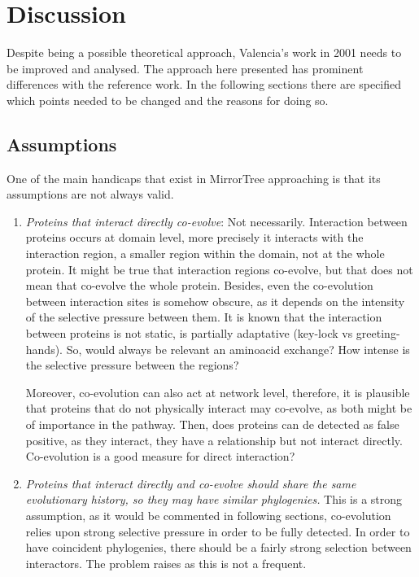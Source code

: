 \documentclass[11pt]{article}
\begin{document}
\section{Discussion}
Despite being a possible theoretical approach, Valencia's work in 2001\cite{Pazos2001} needs to be improved and analysed. The approach here presented has prominent differences with the reference work. In the following sections there are specified which points needed to be changed and the reasons for doing so.

\subsection{Assumptions}
One of the main handicaps that exist in MirrorTree approaching is that its assumptions are not always valid.
\begin{enumerate}
\setlength{\itemsep}{1pt}
	\item \textit{Proteins that interact directly co-evolve}: Not necessarily. Interaction between proteins 		occurs at domain level, more precisely it interacts with the interaction region, a smaller region within 		the domain, not at the whole protein. It might be true that interaction regions co-evolve, but that does 		not mean that co-evolve the whole protein. Besides, even the co-evolution between interaction sites is 		somehow obscure, as it depends on the intensity of the selective pressure between them. It is known that 		the interaction between proteins is not static, is partially adaptative (key-lock vs greeting-hands). So, 	would always be relevant an aminoacid exchange? How intense is the selective pressure between the 			regions?

	Moreover, co-evolution can also act at network level, therefore, it is plausible that proteins that do 		not physically interact may co-evolve, as both might be of importance in the pathway. Then, does proteins 	can de detected as false positive, as they interact, they have a relationship but not interact directly. 		Co-evolution is a good measure for direct interaction?

	\item \textit{Proteins that interact directly and co-evolve should share the same evolutionary history, 		so they may have similar phylogenies.} This is a strong assumption, as it would be commented in following		sections, co-evolution relies upon strong selective pressure in order to be fully detected. In order to 		have coincident phylogenies, there should be a fairly strong selection between interactors. The problem 		raises as this is not a frequent.
\end{enumerate}
\end{document}
